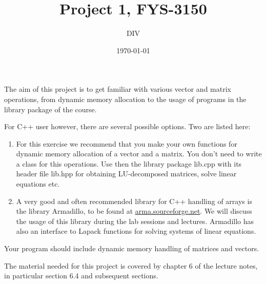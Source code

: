 \documentclass[11pt,a4wide]{article}
\title{Project 1, FYS-3150}
\author{DIV}
\date{\today}
\begin{document}
\maketitle

The aim of this project is to get familiar with various vector and matrix operations,
from dynamic memory allocation to the usage of programs in the library package of the course. 

For C++ user however, there are several possible options. Two are listed here:
\begin{enumerate}
\item For this exercise we recommend that you make your own functions for dynamic memory allocation of a 
vector and a matrix. You don't need to write a class for this operations. 
Use then the 
library package lib.cpp with its header file 
lib.hpp for obtaining LU-decomposed matrices, solve linear equations
etc.
\item A very good and often recommended library for C++ handling of arrays is the library Armadillo, to be found at \url{arma.sourceforge.net}.  We will discuss the usage of this library during the lab sessions and lectures. Armadillo has also an interface to Lapack functions for solving systems of linear equations.
\end{enumerate}

Your program should include dynamic memory handling of matrices and vectors. 

The material needed for this project is covered by chapter 6 of the lecture notes, in particular section 6.4 and subsequent sections.
\end{document}
